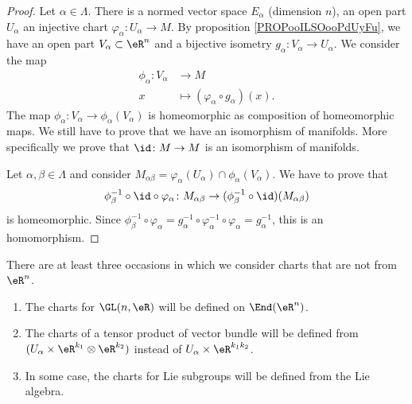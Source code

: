\begin{proof}
	Let \( \alpha\in \Lambda\). There is a normed vector space \( E_{\alpha} \) (dimension \( n\)), an open part \( U_{\alpha}\) an injective chart \(\varphi_{\alpha} \colon U_{\alpha}\to M  \). By proposition \ref{PROPooILSOooPdUyFu}, we have an open part \( V_{\alpha}\subset \eR^n\) and a bijective isometry \(g_{\alpha} \colon V_{\alpha}\to U_{\alpha}  \). We consider the map
	\begin{equation}
		\begin{aligned}
			\phi_{\alpha}\colon V_{\alpha} & \to M                                          \\
			x                              & \mapsto (\varphi_{\alpha}\circ g_{\alpha})(x).
		\end{aligned}
	\end{equation}
	The map \(\phi_{\alpha} \colon V_{\alpha}\to \phi_{\alpha}(V_{\alpha})   \) is homeomorphic as composition of homeomorphic maps. We still have to prove that we have an isomorphism of manifolds. More specifically we prove that \(\id \colon M\to M  \) is an isomorphism of manifolds.

	Let \( \alpha,\beta\in \Lambda\) and consider \( M_{\alpha\beta}=\varphi_{\alpha}(U_{\alpha})\cap \phi_{\alpha}(V_{\alpha})\). We have to prove that
	\begin{equation}
		\phi_{\beta}^{-1}\circ \id\circ \varphi_{\alpha} \colon M_{\alpha\beta}\to  	(\phi_{\beta}^{-1}\circ\id)(M_{\alpha\beta})
	\end{equation}
	is homeomorphic. Since \( \phi_{\beta}^{-1}\circ\varphi_{\alpha}=g_{\alpha}^{-1}\circ\varphi_{\alpha}^{-1}\circ\varphi_{\alpha}=g_{\alpha}^{-1}\), this is an homomorphism.
\end{proof}

There are at least three occasions in which we consider charts that are not from \( \eR^n\).
\begin{enumerate}
	\item
	      The charts for \( \GL(n,\eR)\) will be defined on \( \End(\eR^n)\).
	\item
	      The charts of a tensor product of vector bundle will be defined from \( (U_{\alpha}\times \eR^{k_1}\otimes \eR^{k_2})\) instead of \( U_{\alpha}\times \eR^{k_1k_2}\).
	\item
	      In some case, the charts for Lie subgroups will be defined from the Lie algebra.
\end{enumerate}

